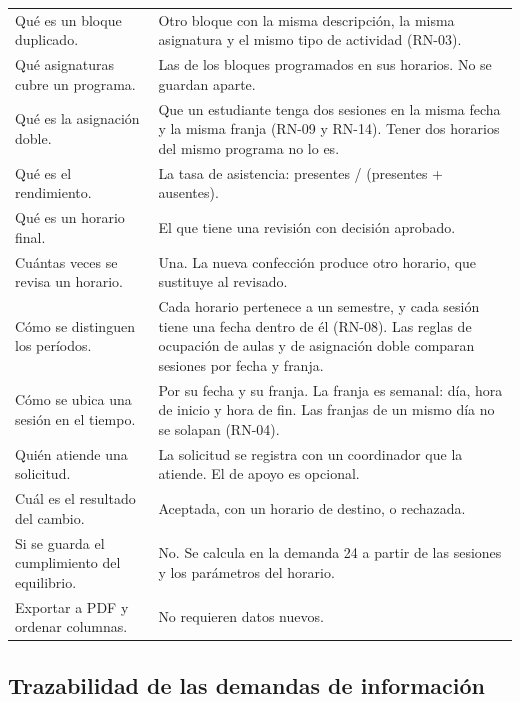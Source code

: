 {\small\filas
\begin{xltabular}{\linewidth}{L{0.85}L{1.15}}
 &  \\
\endhead
Qué es un bloque duplicado. & Otro bloque con la misma descripción, la misma asignatura y el mismo tipo de actividad (RN-03). \\
Qué asignaturas cubre un programa. & Las de los bloques programados en sus horarios. No se guardan aparte. \\
Qué es la asignación doble. & Que un estudiante tenga dos sesiones en la misma fecha y la misma franja (RN-09 y RN-14). Tener dos horarios del mismo programa no lo es. \\
Qué es el rendimiento. & La tasa de asistencia: presentes / (presentes + ausentes). \\
Qué es un horario final. & El que tiene una revisión con decisión aprobado. \\
Cuántas veces se revisa un horario. & Una. La nueva confección produce otro horario, que sustituye al revisado. \\
Cómo se distinguen los períodos. & Cada horario pertenece a un semestre, y cada sesión tiene una fecha dentro de él (RN-08). Las reglas de ocupación de aulas y de asignación doble comparan sesiones por fecha y franja. \\
Cómo se ubica una sesión en el tiempo. & Por su fecha y su franja. La franja es semanal: día, hora de inicio y hora de fin. Las franjas de un mismo día no se solapan (RN-04). \\
Quién atiende una solicitud. & La solicitud se registra con un coordinador que la atiende. El de apoyo es opcional. \\
Cuál es el resultado del cambio. & Aceptada, con un horario de destino, o rechazada. \\
Si se guarda el cumplimiento del equilibrio. & No. Se calcula en la demanda 24 a partir de las sesiones y los parámetros del horario. \\
Exportar a PDF y ordenar columnas. & No requieren datos nuevos. \\
\end{xltabular}}

\subsection{Trazabilidad de las demandas de información}

